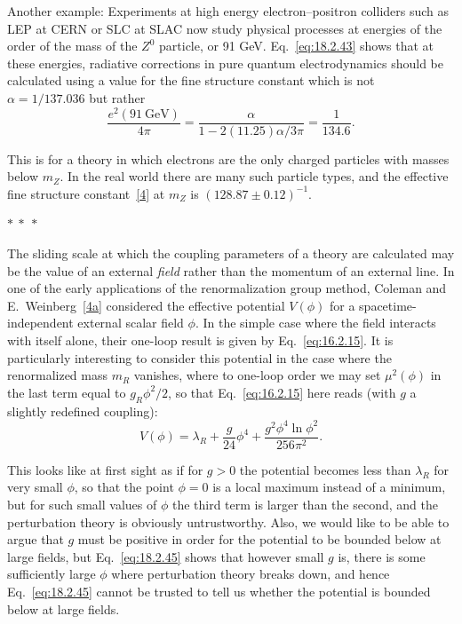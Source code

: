 Another example: Experiments at high energy electron--positron colliders such
as LEP at CERN or SLC at SLAC now study physical processes at energies of the
order of the mass of the $Z^0$ particle, or 91 GeV. Eq.~\eqref{eq:18.2.43}
shows that at these energies, radiative corrections in pure quantum
electrodynamics should be calculated using a value for the fine structure
constant which is not $\alpha=1/137.036$ but rather
\begin{equation}
\frac{e^2(91\ \mathrm{GeV})}{4\pi}
=\frac{\alpha}{1-2(11.25)\alpha/3\pi}=\frac{1}{134.6}.
\tag{18.2.44}\label{eq:18.2.44}
\end{equation}
\par\noindent
This is for a theory in which electrons are the only charged particles with
masses below $m_Z$. In the real world there are many such particle types, and
the effective fine structure constant~\hyperref[ch18-ref-4]{[4]} at $m_Z$ is
$(128.87\pm0.12)^{-1}$.

\begin{center}
$*\ *\ *$
\end{center}

The sliding scale at which the coupling parameters of a theory are calculated
may be the value of an external \emph{field} rather than the momentum of an
external line. In one of the early applications of the renormalization group
method, Coleman and E.~Weinberg~\hyperref[ch18-ref-4a]{[4a]} considered the
effective potential $V(\phi)$ for a spacetime-independent external scalar
field $\phi$. In the simple case where the field interacts with itself alone,
their one-loop result is given by Eq.~\eqref{eq:16.2.15}. It is particularly
interesting to consider this potential in the case where the renormalized
mass $m_R$ vanishes, where to one-loop order we may set $\mu^2(\phi)$ in the
last term equal to $g_R\phi^2/2$, so that Eq.~\eqref{eq:16.2.15} here reads
(with $g$ a slightly redefined coupling):
\begin{equation}
V(\phi)=\lambda_R+\frac{g}{24}\phi^4
+\frac{g^2\phi^4\ln\phi^2}{256\pi^2}.
\tag{18.2.45}\label{eq:18.2.45}
\end{equation}
\par\noindent
This looks like at first sight as if for $g>0$ the potential becomes less than
$\lambda_R$ for very small $\phi$, so that the point $\phi=0$ is a local
maximum instead of a minimum, but for such small values of $\phi$ the third
term is larger than the second, and the perturbation theory is obviously
untrustworthy. Also, we would like to be able to argue that $g$ must be
positive in order for the potential to be bounded below at large fields, but
Eq.~\eqref{eq:18.2.45} shows that however small $g$ is, there is some
sufficiently large $\phi$ where perturbation theory breaks down, and hence
Eq.~\eqref{eq:18.2.45} cannot be trusted to tell us whether the potential is
bounded below at large fields.

